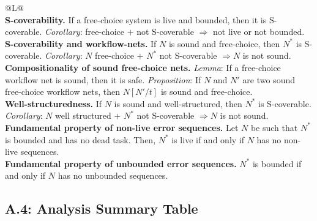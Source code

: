 \bigskip
\begin{tabularx}{\linewidth}{@{}L@{}}
\toprule
{}  \\
\midrule
\textbf{S-coverability.} If a free-choice system is live and bounded, then it is S-coverable. \emph{Corollary}: free-choice $+$ not S-coverable $\Rightarrow$ not live or not bounded. \\
\midrule
\textbf{S-coverability and workflow-nets.} If $N$ is sound and free-choice, then $N^*$ is S-coverable. \emph{Corollary}: $N$ free-choice $+$ $N^*$ not S-coverable $\Rightarrow N$ is not sound. \\
\midrule
\textbf{Compositionality of sound free-choice nets.} \emph{Lemma}: If a free-choice workflow net is sound, then it is safe. \emph{Proposition}: If $N$ and $N'$ are two sound free-choice workflow nets, then $N[N'/t]$ is sound and free-choice. \\
\midrule
\textbf{Well-structuredness.} If $N$ is sound and well-structured, then $N^*$ is S-coverable. \emph{Corollary}: $N$ well structured $+$ $N^*$ not S-coverable $\Rightarrow N$ is not sound. \\
\midrule
\textbf{Fundamental property of non-live error sequences.} Let $N$ be such that $N^*$ is bounded and has no dead task. Then, $N^*$ is live if and only if $N$ has no non-live sequences. \\
\midrule
\textbf{Fundamental property of unbounded error sequences.} $N^*$ is bounded if and only if $N$ has no unbounded sequences. \\
\bottomrule
\end{tabularx}

\subsection*{A.4: Analysis Summary Table}

